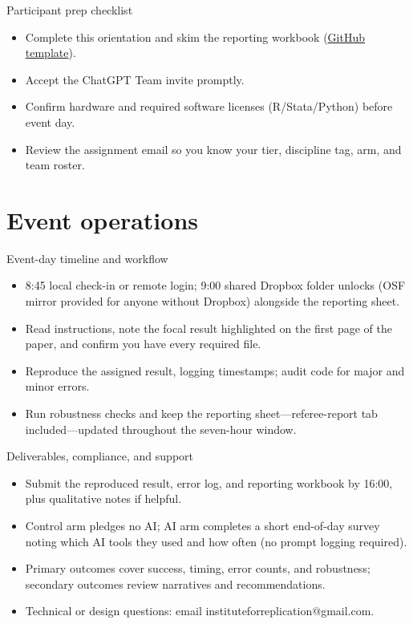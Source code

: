 \documentclass[aspectratio=169,professionalfonts]{beamer}
\begin{document}
\begin{frame}{Participant prep checklist}
  \begin{itemize}
    \item Complete this orientation and skim the reporting workbook (\href{https://github.com/I4Replication/AI-vertical/blob/main/Reports/Replication_Log_Referee_Template.xlsx}{GitHub template}).
    \item Accept the ChatGPT Team invite promptly.
    \item Confirm hardware and required software licenses (R/Stata/Python) before event day.
    \item Review the assignment email so you know your tier, discipline tag, arm, and team roster.
  \end{itemize}
\end{frame}

\section{Event operations}

\begin{frame}{Event-day timeline and workflow}
  \begin{itemize}
    \item 8:45 local check-in or remote login; 9:00 shared Dropbox folder unlocks (OSF mirror provided for anyone without Dropbox) alongside the reporting sheet.
    \item Read instructions, note the focal result highlighted on the first page of the paper, and confirm you have every required file.
    \item Reproduce the assigned result, logging timestamps; audit code for major and minor errors.
    \item Run robustness checks and keep the reporting sheet—referee-report tab included—updated throughout the seven-hour window.
  \end{itemize}
\end{frame}

\begin{frame}{Deliverables, compliance, and support}
  \begin{itemize}
    \item Submit the reproduced result, error log, and reporting workbook by 16:00, plus qualitative notes if helpful.
    \item Control arm pledges no AI; AI arm completes a short end-of-day survey noting which AI tools they used and how often (no prompt logging required).
    \item Primary outcomes cover success, timing, error counts, and robustness; secondary outcomes review narratives and recommendations.
    \item Technical or design questions: email instituteforreplication@gmail.com.
  \end{itemize}
\end{frame}
\end{document}
